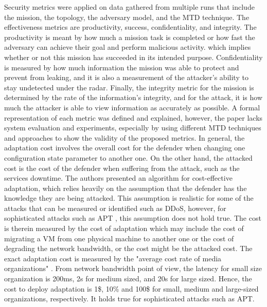Security metrics were applied on data gathered from multiple runs that include the mission, the topology, the adversary model, and the MTD technique. The effectiveness metrics are productivity, success, confidentiality, and integrity. The productivity is meant by how much a mission task is completed or how fast the adversary can achieve their goal and perform malicious activity. which implies whether or not this mission has succeeded in its intended purpose. Confidentiality is measured by how much information the mission was able to protect and prevent from leaking, and it is also a measurement of the attacker's ability to stay undetected under the radar. Finally, the integrity metric for the mission is determined by the rate of the information's integrity, and for the attack, it is how much the attacker is able to view information as accurately as possible. A formal representation of each metric was defined and explained, however, the paper lacks system evaluation and experiments, especially by using different MTD techniques and approaches to show the validity of the proposed metrics. 
In general, the adaptation cost involves the overall cost for the defender when changing one configuration state parameter to another one. On the other hand, the attacked cost is the cost of the defender when suffering from the attack, such as the services downtime. 
The authors presented an algorithm for cost-effective adaptation, which relies heavily on the assumption that the defender has the knowledge they are being attacked. This assumption is realistic for some of the attacks that can be measured or identified such as DDoS, however, for sophisticated attacks such as APT , this assumption does not hold true. The cost is therein measured by the cost of adaptation which may include the cost of migrating a VM from one physical machine to another one or the cost of degrading the network bandwidth, or the cost might be the attacked cost.
The exact adaptation cost is measured by the "average cost rate of media organizations" . From network bandwidth point of view, the latency for small size organization is 200ms, 2s for medium sized, and 20s for large sized. Hence, the cost to deploy adaptation is 1\$, 10\% and 100\$ for small, medium and large-sized organizations, respectively. It holds true for sophisticated attacks such as APT.\\ 
